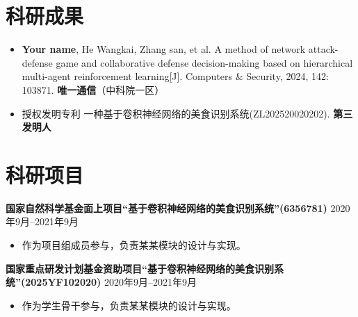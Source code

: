 \documentclass[11pt]{article}
\newlength{\iconwidth}
\begin{document}
    
    \begin{minipage}[t]{\textwidth}
        \section[科研成果]{\makebox[\iconwidth][c]{\color{primary_color}{\faFile*[regular]}}\quad 科研成果}
        \begin{itemize}
            \item \textbf{Your name}, He Wangkai, Zhang san, et al.  A method of network attack-defense game and collaborative defense decision-making based on hierarchical multi-agent reinforcement learning[J]. Computers \& Security, 2024, 142: 103871. \hfill \textbf{唯一通信}（中科院一区）
            \vspace{0.5em}
            \item 授权发明专利 一种基于卷积神经网络的美食识别系统(ZL202520020202). \hfill \textbf{第三发明人}
        \end{itemize}
        
        \vspace{1.2em}
    \end{minipage}

    \begin{minipage}[t]{\textwidth}
        \section[科研项目]{\makebox[\iconwidth][c]{\color{primary_color}{\faChalkboardTeacher}}\quad 科研项目}
        
        {\large \textbf{国家自然科学基金面上项目“基于卷积神经网络的美食识别系统”(6356781)}} \hfill 2020年9月--2021年9月
        \begin{itemize}
            \item 作为项目组成员参与，负责某某模块的设计与实现。
        \end{itemize}

        {\large \textbf{国家重点研发计划基金资助项目“基于卷积神经网络的美食识别系统”(2025YF102020)}} \hfill 2020年9月--2021年9月
        \begin{itemize}
            \item 作为学生骨干参与，负责某某模块的设计与实现。
        \end{itemize}
        
        \vspace{1.2em}
    \end{minipage}
    
\end{document}
